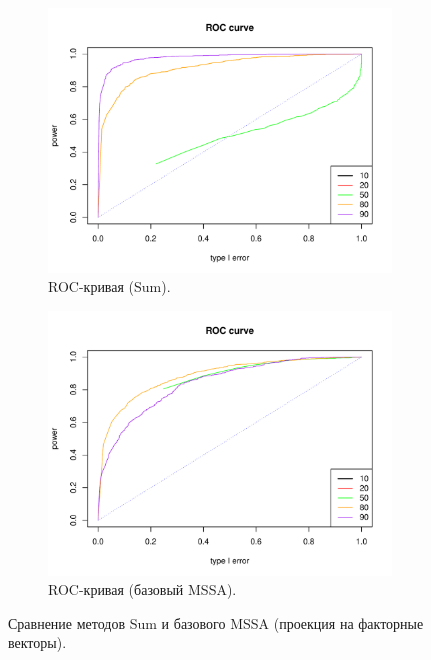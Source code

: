 \documentclass[specialist,
substylefile = spbu_report.rtx,
subf,href,colorlinks=true, 12pt]{disser}
\theoremstyle{definition}
\begin{document}
\begin{figure}
\begin{subfigure}[t]{0.45\textwidth}
			\centering
			\includegraphics[width=\textwidth]{roc_sum_fa.pdf}
			\caption{ROC-кривая (Sum).}
		\end{subfigure}\hspace{\fill}
		\begin{subfigure}[t]{0.45\textwidth}
			\centering
			\includegraphics[width=\textwidth]{roc_mssa_fa.pdf}
			\caption{ROC-кривая (базовый MSSA).}
		\end{subfigure}
		\caption{Сравнение методов Sum и базового MSSA (проекция на факторные векторы).}
		\label{fig:sum_fa}
	\end{figure}
\end{document}
